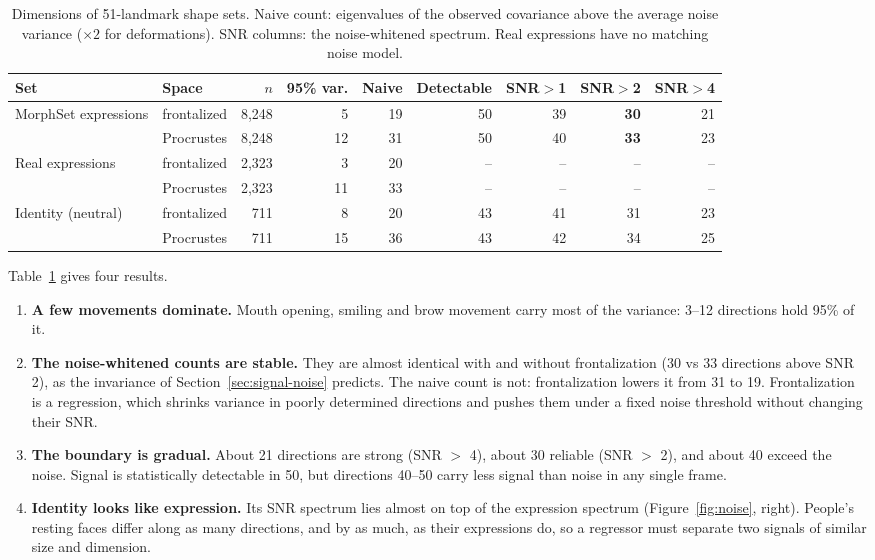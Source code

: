 \documentclass[11pt,a4paper]{article}
\begin{document}
\begin{table}[t]
  \centering\small
  \caption{Dimensions of 51-landmark shape sets. Naive count: eigenvalues of the observed
  covariance above the average noise variance ($\times 2$ for deformations). SNR columns: the
  noise-whitened spectrum. Real expressions have no matching noise model.}\label{tab:dims}
  \setlength{\tabcolsep}{4pt}
  \begin{tabular}{llrrrrrrr}
    \toprule
    Set & Space & $n$ & 95\% var. & Naive & Detectable & SNR$>$1 & SNR$>$2 & SNR$>$4 \\
    \midrule
    MorphSet expressions & frontalized & 8,248 & 5 & 19 & 50 & 39 & \textbf{30} & 21 \\
                         & Procrustes  & 8,248 & 12 & 31 & 50 & 40 & \textbf{33} & 23 \\
    Real expressions     & frontalized & 2,323 & 3 & 20 & -- & -- & -- & -- \\
                         & Procrustes  & 2,323 & 11 & 33 & -- & -- & -- & -- \\
    Identity (neutral)   & frontalized & 711 & 8 & 20 & 43 & 41 & 31 & 23 \\
                         & Procrustes  & 711 & 15 & 36 & 43 & 42 & 34 & 25 \\
    \bottomrule
  \end{tabular}
\end{table}

Table~\ref{tab:dims} gives four results.
\begin{enumerate}
  \item \textbf{A few movements dominate.} Mouth opening, smiling and brow movement carry most of
  the variance: 3--12 directions hold 95\% of it.
  \item \textbf{The noise-whitened counts are stable.} They are almost identical with and without
  frontalization (30 vs 33 directions above SNR 2), as the invariance of
  Section~\ref{sec:signal-noise} predicts. The naive count is not: frontalization lowers it from
  31 to 19. Frontalization is a regression, which shrinks variance in poorly determined directions
  and pushes them under a fixed noise threshold without changing their SNR.
  \item \textbf{The boundary is gradual.} About 21 directions are strong (SNR $>$ 4), about 30
  reliable (SNR $>$ 2), and about 40 exceed the noise. Signal is statistically detectable in 50,
  but directions 40--50 carry less signal than noise in any single frame.
  \item \textbf{Identity looks like expression.} Its SNR spectrum lies almost on top of the
  expression spectrum (Figure~\ref{fig:noise}, right). People's resting faces differ along as many
  directions, and by as much, as their expressions do, so a regressor must separate two signals of
  similar size and dimension.
\end{enumerate}
\end{document}
